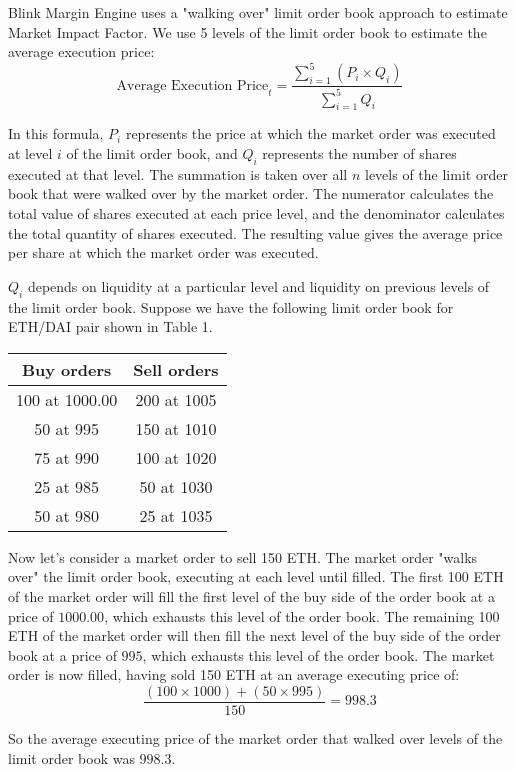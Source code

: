 \documentclass[conference]{IEEEtran}
\begin{document}
Blink Margin Engine uses a "walking over" limit order book approach to estimate Market Impact Factor. We use 5 levels of the limit order book to estimate the average execution price: $$ \text{Average Execution Price}_{t} = \frac{\sum\limits_{i=1}^{5} (P_i \times Q_i)}{\sum\limits_{i=1}^{5} Q_i} $$

In this formula, $P_i$ represents the price at which the market order was executed at level $i$ of the limit order book, and $Q_i$ represents the number of shares executed at that level. The summation is taken over all $n$ levels of the limit order book that were walked over by the market order. The numerator calculates the total value of shares executed at each price level, and the denominator calculates the total quantity of shares executed. The resulting value gives the average price per share at which the market order was executed.

$Q_i$ depends on liquidity at a particular level and liquidity on previous levels of the limit order book. Suppose we have the following limit order book for ETH/DAI pair shown in Table 1.

\begin{table}[h]
\centering
\begin{tabular}{| c | c |}
\hline
 Buy orders & Sell orders \\
\hline
 100  at 1000.00 & 200  at 1005 \\
 50  at 995 & 150  at 1010 \\
 75  at 990 & 100  at 1020 \\
 25  at 985 & 50  at 1030 \\
 50  at 980 & 25  at 1035 \\
\hline
\end{tabular}
\end{table}

Now let's consider a market order to sell 150 ETH. The market order "walks over" the limit order book, executing at each level until filled.
The first 100 ETH of the market order will fill the first level of the buy side of the order book at a price of $1000.00$, which exhausts this level of the order book.
The remaining 100 ETH of the market order will then fill the next level of the buy side of the order book at a price of $995$, which exhausts this level of the order book.
The market order is now filled, having sold 150 ETH at an average executing price of:
$$\frac{(100 \times 1000) + (50 \times 995)}{150} = 998.3$$



So the average executing price of the market order that walked over levels of the limit order book was $998.3$.
\end{document}
